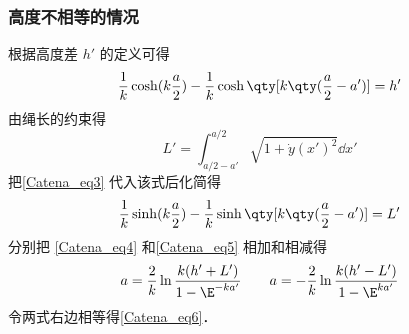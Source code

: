 \subsubsection{高度不相等的情况}
根据高度差 $h'$ 的定义可得
\begin{equation}\label{Catena_eq4}
\frac{1}{k}\cosh(k\frac{a}{2}) - \frac{1}{k}\cosh\qty[k\qty(\frac{a}{2}-a')] = h'
\end{equation}
由绳长的约束得
\begin{equation}
L' = \int_{a/2-a'}^{a/2} \sqrt{1 + \dot y(x')^2} \dd{x'}
\end{equation}
把\autoref{Catena_eq3} 代入该式后化简得
\begin{equation}\label{Catena_eq5}
\frac{1}{k}\sinh(k\frac{a}{2}) - \frac{1}{k}\sinh\qty[k\qty(\frac{a}{2}-a')] = L'
\end{equation}
分别把 \autoref{Catena_eq4} 和\autoref{Catena_eq5} 相加和相减得
\begin{equation}
a = \frac{2}{k} \ln\frac{k(h'+L')}{1 - \E^{-ka'}}
\qquad
a = -\frac{2}{k} \ln\frac{k(h'-L')}{1 - \E^{ka'}}
\end{equation}
令两式右边相等得\autoref{Catena_eq6}．
